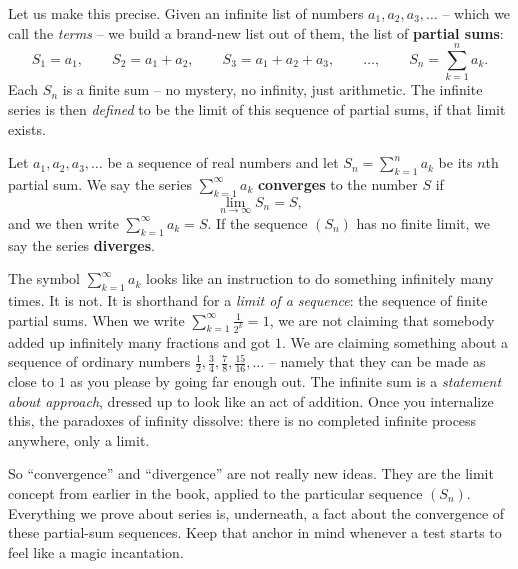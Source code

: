 Let us make this precise. Given an infinite list of numbers $a_1, a_2, a_3, \dots$ -- which we call the \emph{terms} -- we build a brand-new list out of them, the list of \textbf{partial sums}:
\[
S_1 = a_1, \qquad
S_2 = a_1 + a_2, \qquad
S_3 = a_1 + a_2 + a_3, \qquad \dots, \qquad
S_n = \sum_{k=1}^{n} a_k .
\]
Each $S_n$ is a finite sum -- no mystery, no infinity, just arithmetic. The infinite series is then \emph{defined} to be the limit of this sequence of partial sums, if that limit exists.

\begin{definition}
\label{ch29:def-convergence}
Let $a_1, a_2, a_3, \dots$ be a sequence of real numbers and let $S_n = \sum_{k=1}^n a_k$ be its $n$th partial sum. We say the series $\sum_{k=1}^{\infty} a_k$ \textbf{converges} to the number $S$ if
\[
\lim_{n \to \infty} S_n = S,
\]
and we then write $\sum_{k=1}^{\infty} a_k = S$. If the sequence $(S_n)$ has no finite limit, we say the series \textbf{diverges}.
\end{definition}

\begin{happeningbox}
The symbol $\sum_{k=1}^{\infty} a_k$ looks like an instruction to do something infinitely many times. It is not. It is shorthand for a \emph{limit of a sequence}: the sequence of finite partial sums. When we write $\sum_{k=1}^\infty \tfrac{1}{2^k} = 1$, we are not claiming that somebody added up infinitely many fractions and got $1$. We are claiming something about a sequence of ordinary numbers $\tfrac12, \tfrac34, \tfrac78, \tfrac{15}{16}, \dots$ -- namely that they can be made as close to $1$ as you please by going far enough out. The infinite sum is a \emph{statement about approach}, dressed up to look like an act of addition. Once you internalize this, the paradoxes of infinity dissolve: there is no completed infinite process anywhere, only a limit.
\end{happeningbox}

So ``convergence'' and ``divergence'' are not really new ideas. They are the limit concept from earlier in the book, applied to the particular sequence $(S_n)$. Everything we prove about series is, underneath, a fact about the convergence of these partial-sum sequences. Keep that anchor in mind whenever a test starts to feel like a magic incantation.


